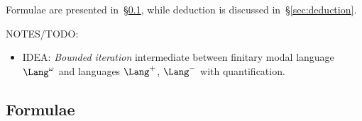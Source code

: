 Formulae are presented in~\S\ref{sec:formulae},
while deduction is discussed in~\S\ref{sec:deduction}.



\begin{colinpar}
NOTES/TODO:
\begin{itemize}
\item IDEA: \emph{Bounded iteration}
intermediate between finitary modal language $\Lang^\omega$
and languages $\Lang^+$, $\Lang^-$
with quantification.
\end{itemize}
\end{colinpar}



\subsection{Formulae}
\label{sec:formulae}

